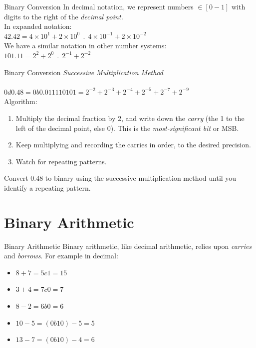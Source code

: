 \documentclass{beamer}
\begin{document}
\begin{frame}{Binary Conversion}
In decimal notation, we represent numbers $\in [0-1]$ with digits to the right of the \textit{decimal point.} \\ \vspace{0.5cm}
In expanded notation: \\
$42.42 = 4\times 10^{1} + 2\times 10^{0} ~~ . ~~ 4\times 10^{-1} + 2\times 10^{-2}$ \\ \vspace{0.5cm}
We have a similar notation in other number systems: \\
$101.11 = 2^2 + 2^0 ~~ . ~~ 2^{-1} + 2^{-2}$
\end{frame}

\begin{frame}{Binary Conversion}
\textit{Successive Multiplication Method} \\ \vspace{0.5cm} \hrulefill \\
$0d0.48 = 0b0.011110101 = 2^{-2}+2^{-3}+2^{-4}+2^{-5}+2^{-7}+2^{-9}$ \\
Algorithm:
\begin{enumerate}
\item Multiply the decimal fraction by 2, and write down the \textit{carry} (the 1 to the left of the decimal point, else 0).  This is the \textit{most-significant bit} or MSB.
\item Keep multiplying and recording the carries in order, to the desired precision.
\item Watch for repeating patterns.
\end{enumerate}
Convert 0.48 to binary using the successive multiplication method until you identify a repeating pattern.
\end{frame}

\section{Binary Arithmetic}

\begin{frame}{Binary Arithmetic}
Binary arithmetic, like decimal arithmetic, relies upon \textit{carries} and \textit{borrows}.  For example in decimal: \\ \vspace{0.5cm}
\begin{itemize}
\item $8+7 = 5 c 1 = 15$
\item $3+4 = 7 c 0 = 7$
\item $8-2 = 6 b 0 = 6$
\item $10-5 = (0 b 10) - 5 = 5$
\item $13-7 = (0 b 10) - 4 = 6$ 
\end{itemize}
\end{frame}
\end{document}
